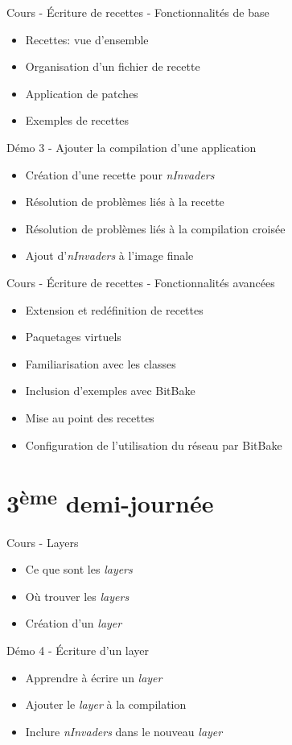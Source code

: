 \documentclass[a4paper,12pt,obeyspaces,spaces,hyphens]{article}
\begin{document}
\feagendatwocolumn
{Cours - Écriture de recettes - Fonctionnalités de base}
{
  \begin{itemize}
  \item Recettes: vue d'ensemble
  \item Organisation d'un fichier de recette
  \item Application de patches
  \item Exemples de recettes
  \end{itemize}
}
{Démo 3 - Ajouter la compilation d'une application}
{
  \begin{itemize}
  \item Création d'une recette pour {\em nInvaders}
  \item Résolution de problèmes liés à la recette
  \item Résolution de problèmes liés à la compilation croisée
  \item Ajout d'{\em nInvaders} à l'image finale
  \end{itemize}
}

\feagendaonecolumn
{Cours - Écriture de recettes - Fonctionnalités avancées}
{
  \begin{itemize}
  \item Extension et redéfinition de recettes
  \item Paquetages virtuels
  \item Familiarisation avec les classes
  \item Inclusion d'exemples avec BitBake
  \item Mise au point des recettes
  \item Configuration de l'utilisation du réseau par BitBake
  \end{itemize}
}

\section{3\textsuperscript{ème} demi-journée}

\feagendatwocolumn
{Cours - Layers}
{
  \begin{itemize}
  \item Ce que sont les {\em layers}
  \item Où trouver les {\em layers}
  \item Création d'un {\em layer}
  \end{itemize}
}
{Démo 4 - Écriture d'un layer}
{
  \begin{itemize}
  \item Apprendre à écrire un {\em layer}
  \item Ajouter le {\em layer} à la compilation
  \item Inclure {\em nInvaders} dans le nouveau {\em layer}
  \end{itemize}
}
\end{document}
